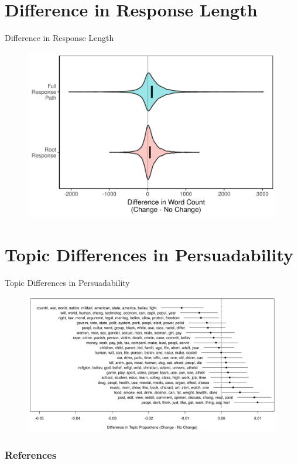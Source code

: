 \documentclass{beamer}
\begin{document}
\section{Difference in Response Length}
\begin{frame}{Difference in Response Length}
\begin{figure}
	\includegraphics{../calc/fig/wordcount_violin.png}
\end{figure}
\end{frame}

\section{Topic Differences in Persuadability}
\begin{frame}{Topic Differences in Persuadability}
\begin{figure}
\includegraphics[width=\textwidth]{../calc/fig/stm_op_diff.png}
\end{figure}
\end{frame}

\begin{frame} %
  \frametitle{References}
  \def\newblock{\hskip .11em plus .33em minus .07em}
  \begin{scriptsize}
    
    
  \end{scriptsize}
\end{frame}
\end{document}
